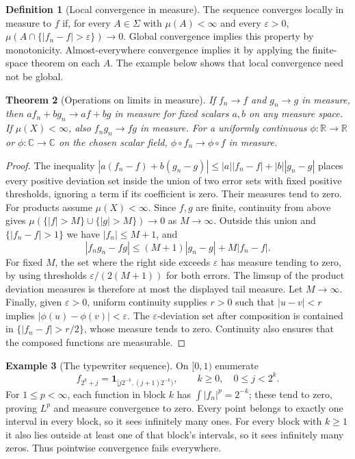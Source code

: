 \documentclass[11pt,oneside,openany]{book}
\newtheorem{theorem}{Theorem}[chapter]
\theoremstyle{definition}
\newtheorem{definition}[theorem]{Definition}
\newtheorem{example}[theorem]{Example}
\theoremstyle{remark}
\newcommand{\R}{\mathbb R}\newcommand{\C}{\mathbb C}
\newcommand{\eps}{\varepsilon}\newcommand{\ee}{\varepsilon}
\newcommand{\one}{\mathbf1}\newcommand{\ind}[1]{\mathbf1_{#1}}
\newcommand{\family}[1]{}
\begin{document}
\begin{definition}[Local convergence in measure]
\family{D11.07.local_measure}\label{d11:07:local-measure}
The sequence converges locally in measure to $f$ if, for every $A\in\Sigma$
with $\mu(A)<\infty$ and every $\eps>0$,
$\mu(A\cap\{|f_n-f|>\eps\})\to0$.
Global convergence implies this property by monotonicity. Almost-everywhere
convergence implies it by applying the finite-space theorem on each $A$.
The example below shows that local convergence need not be global.
\end{definition}

\begin{theorem}[Operations on limits in measure]
\family{D11.07.measure_algebra_operations}\label{d11:07:measure-algebra-operations}
If $f_n\to f$ and $g_n\to g$ in measure, then
$af_n+bg_n\to af+bg$ in measure for fixed scalars $a,b$ on any measure
space. If $\mu(X)<\infty$, also $f_ng_n\to fg$ in measure.
For a uniformly continuous $\phi:\R\to\R$ or $\phi:\C\to\C$ on the
chosen scalar field, $\phi\circ f_n\to\phi\circ f$ in measure.
\end{theorem}
\begin{proof}
The inequality
$|a(f_n-f)+b(g_n-g)|\leq|a||f_n-f|+|b||g_n-g|$
places every positive deviation set inside the union of two error sets
with fixed positive thresholds, ignoring a term if its coefficient is
zero. Their measures tend to zero. For products assume $\mu(X)<\infty$.
Since $f,g$ are finite, continuity from above gives
$\mu(\{|f|>M\}\cup\{|g|>M\})\to0$ as $M\to\infty$.
Outside this union and $\{|f_n-f|>1\}$ we have $|f_n|\leq M+1$, and
\[
 |f_ng_n-fg|\leq(M+1)|g_n-g|+M|f_n-f|.
\]
For fixed $M$, the set where the right side exceeds $\eps$ has measure
tending to zero, by using thresholds $\eps/(2(M+1))$ for both errors.
The limsup of the product deviation measures is therefore at most the
displayed tail measure. Let $M\to\infty$.
Finally, given $\eps>0$, uniform continuity supplies $r>0$ such that
$|u-v|<r$ implies $|\phi(u)-\phi(v)|<\eps$.
The $\eps$-deviation set after composition is contained in
$\{|f_n-f|>r/2\}$, whose measure tends to zero. Continuity also ensures
that the composed functions are measurable.
\end{proof}

\begin{example}[The typewriter sequence]
\family{D11.07.typewriter_counterexample}\label{d11:07:typewriter-counterexample}
On $[0,1)$ enumerate
\[
 f_{2^k+j}=\one_{[j2^{-k},(j+1)2^{-k})},
 \qquad k\geq0,\quad0\leq j<2^k.
\]
For $1\leq p<\infty$, each function in block $k$ has
$\int|f_n|^p=2^{-k}$; these tend to zero, proving $L^p$ and measure
convergence to zero. Every point belongs to exactly one interval in every
block, so it sees infinitely many ones. For every block with $k\geq1$
it also lies outside at least one of that block's intervals, so it sees
infinitely many zeros. Thus pointwise convergence fails everywhere.
\end{example}
\end{document}
